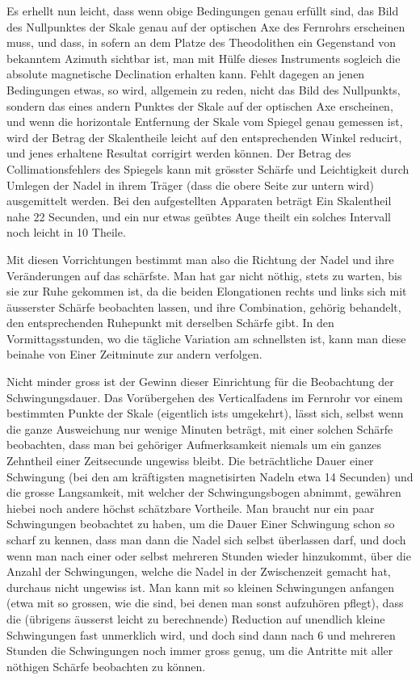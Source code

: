 Es erhellt nun leicht, dass wenn obige Bedingungen genau erfüllt sind,
das Bild des Nullpunktes der Skale genau auf der optischen Axe des
Fernrohrs erscheinen muss, und dass, in sofern an dem Platze des
Theodolithen ein Gegenstand von bekanntem Azimuth sichtbar ist, man
mit Hülfe dieses Instruments sogleich die absolute magnetische
Declination erhalten kann. Fehlt dagegen an jenen Bedingungen etwas,
so wird, allgemein zu reden, nicht das Bild des Nullpunkts, sondern
das eines andern Punktes der Skale auf der optischen Axe erscheinen,
und wenn die horizontale Entfernung der Skale vom Spiegel genau
gemessen ist, wird der Betrag der Skalentheile leicht auf den
entsprechenden Winkel reducirt, und jenes erhaltene Resultat
corrigirt werden können. Der Betrag des Collimationsfehlers des
Spiegels kann mit grösster Schärfe und Leichtigkeit durch Umlegen
der Nadel in ihrem Träger (dass die obere Seite zur untern
\clearpage
{}
\noindent
wird) ausgemittelt werden. Bei den aufgestellten Apparaten beträgt
Ein Skalentheil nahe 22 Secunden, und ein nur etwas geübtes Auge
theilt ein solches Intervall noch leicht in 10 Theile.

Mit diesen Vorrichtungen bestimmt man also die Richtung der Nadel
und ihre Veränderungen auf das schärfste. Man hat gar nicht nöthig,
stets zu warten, bis sie zur Ruhe gekommen ist, da die beiden
Elongationen rechts und links sich mit äusserster Schärfe beobachten
lassen, und ihre Combination, gehörig behandelt, den entsprechenden
Ruhepunkt mit derselben Schärfe gibt. In den Vormittagsstunden, wo
die tägliche Variation am schnellsten ist, kann man diese beinahe
von Einer Zeitminute zur andern verfolgen.

Nicht minder gross ist der Gewinn dieser Einrichtung für die
Beobachtung der Schwingungsdauer. Das Vorübergehen des Verticalfadens
im Fernrohr vor einem bestimmten Punkte der Skale (eigentlich ists
umgekehrt), lässt sich, selbst wenn die ganze Ausweichung nur wenige
Minuten beträgt, mit einer solchen Schärfe beobachten, dass man bei
gehöriger Aufmerksamkeit niemals um ein ganzes Zehntheil einer
Zeitsecunde ungewiss bleibt. Die beträchtliche Dauer einer Schwingung
(bei den am kräftigsten magnetisirten Nadeln etwa 14 Secunden) und
die grosse Langsamkeit, mit welcher der Schwingungsbogen abnimmt,
gewähren hiebei noch andere höchst schätzbare Vortheile. Man braucht
nur ein paar Schwingungen beobachtet zu haben, um die Dauer Einer
Schwingung schon so scharf zu kennen, dass man dann die Nadel sich
selbst überlassen darf, und doch wenn man nach einer oder selbst
mehreren Stunden wieder hinzukommt, über die Anzahl der Schwingungen,
welche die Nadel in der Zwischenzeit gemacht hat, durchaus nicht
ungewiss ist. Man kann mit so kleinen Schwingungen anfangen (etwa
mit so grossen, wie die sind, bei denen man sonst aufzuhören pflegt),
dass die (übrigens äusserst leicht zu berechnende) Reduction auf
unendlich kleine Schwingungen fast unmerklich wird, und doch sind
dann nach 6 und mehreren Stunden die Schwingungen noch immer gross
genug, um die Antritte mit aller nöthigen Schärfe beobachten zu können.

